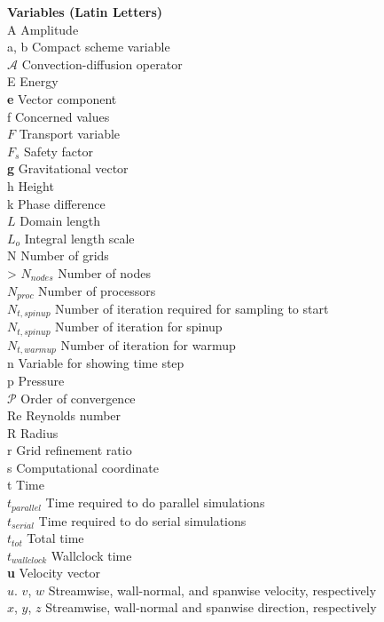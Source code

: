 \begin{tabbing}
	\textbf{Variables (Latin Letters)}\\
	A \> Amplitude \\
	a, b \> Compact scheme variable\\
	$\mathcal{A}$ \> Convection-diffusion operator\\
	E \> Energy\\
	\textbf{e} \> Vector component \\
	f \> Concerned values \\
	$F$ \> Transport variable \\
	$F_s$ \> Safety factor \\
	\textbf{g} \> Gravitational vector \\
	h \> Height \\
	k \> Phase difference \\
	$L$ \> Domain length \\
	$L_o$ \> Integral length scale\\
	N \> Number of grids \\>
	$N_{nodes}$ \> Number of nodes \\
	$N_{proc}$ \> Number of processors \\
	$N_{t, spinup}$ \> Number of iteration required for sampling to start \\
	$N_{t, spinup}$ \> Number of iteration for spinup \\
	$N_{t, warmup}$ \> Number of iteration for warmup \\
	n \> Variable for showing time step \\
	p \> Pressure \\
	$\mathcal{P}$ \> Order of convergence\\
	Re \> Reynolds number\\
	R \> Radius \\
	r \> Grid refinement ratio \\
	s \> Computational coordinate \\
	t \> Time \\
	$t_{parallel}$ \> Time required to do parallel simulations\\
	$t_{serial}$ \> Time required to do serial simulations\\
	$t_{tot}$ \> Total time \\
	$t_{wallclock}$ \> Wallclock time\\
	\textbf{u} \> Velocity vector \\
	$u$. $v$, $w$ \> Streamwise, wall-normal, and spanwise velocity, respectively\\
	$x$, $y$, $z$  \> Streamwise, wall-normal and spanwise direction, respectively\\
	\\
	

\end{tabbing}
